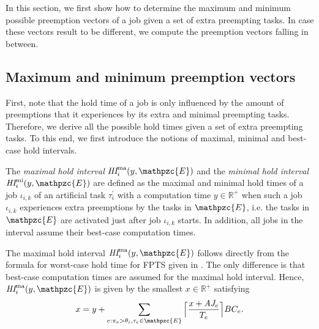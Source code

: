 In this section, we first show how to determine the maximum and minimum possible preemption vectors of a job given a set of extra preempting tasks. In case these vectors result to be different, we compute the preemption vectors falling in between.

\subsection{Maximum and minimum preemption vectors}
First, note that the hold time of a job is only influenced by the amount of preemptions that it experiences by its extra and minimal preempting tasks. Therefore, we derive all the possible hold times given a set of extra preempting tasks. To this end, we first introduce the notions of maximal, minimal and best-case hold intervals.


\begin{definition}
The \textit{maximal hold interval} $\hi^{\rm{ma}}_i(y,\mathpzc{E})$ and the \textit{minimal hold interval} $\hi^{\rm{mi}}_i(y,\mathpzc{E})$ are defined as the maximal and minimal hold times of a job $\iota_{i,k}$ of an artificial task $\tau^{\prime}_i$ with a computation time $y \in \mathbb{R}^+$ when such a job $\iota_{i,k}$ experiences extra preemptions by the tasks in $\mathpzc{E}$, i.e. the tasks in  $\mathpzc{E}$ are activated just after job $\iota_{i,k}$ starts. In addition, all jobs in the interval assume their best-case computation times.
\end{definition}

The {maximal hold interval} $\hi^{\rm{ma}}_i(y,\mathpzc{E})$ follows directly from the formula for {worst-case hold time} for FPTS given in \cite{BAHDB17}. The only difference is that best-case computation times are assumed for the {maximal hold interval}. Hence, $\hi^{\rm{ma}}_i(y,\mathpzc{E})$ is given by the smallest $x \in \mathbb{R}^+$ satisfying
\begin{align}
x = y + \sum\limits_{e:\pi_e > \theta_i, \tau_e \in \mathpzc{E}}\Big\lceil  \dfrac{x+ \aj_e}{T_e}\Big\rceil  BC_e.
\end{align}

